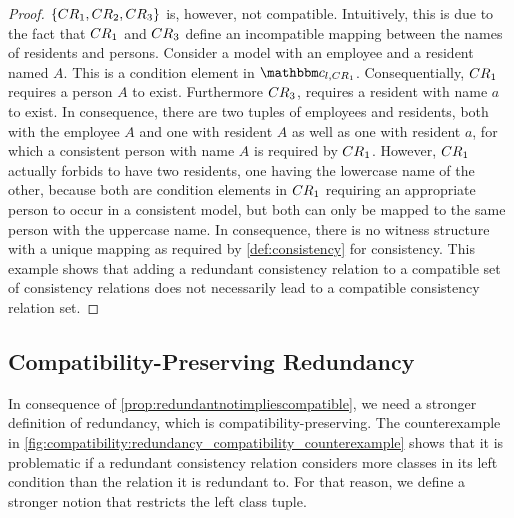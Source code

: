 \begin{proof}
$\setted{\consistencyrelation{CR}{1}, \consistencyrelation{CR}{2}, \consistencyrelation{CR}{3}}$ is, however, not compatible.
Intuitively, this is due to the fact that $\consistencyrelation{CR}{1}$ and $\consistencyrelation{CR}{3}$ define an incompatible mapping between the names of residents and persons.
Consider a model with an employee and a resident named $A$. This is a condition element in $\condition{c}{l,\consistencyrelation{CR}{1}}$. 
Consequentially, $\consistencyrelation{CR}{1}$ requires a person $A$ to exist. Furthermore $\consistencyrelation{CR}{3}$, requires a resident with name $a$ to exist.
In consequence, there are two tuples of employees and residents, both with the employee $A$ and one with resident $A$ as well as one with resident $a$, for which a consistent person with name $A$ is required by $\consistencyrelation{CR}{1}$.
However, $\consistencyrelation{CR}{1}$ actually forbids to have two residents, one having the lowercase name of the other, because both are condition elements in $\consistencyrelation{CR}{1}$ requiring an appropriate person to occur in a consistent model, but both can only be mapped to the same person with the uppercase name.
In consequence, there is no witness structure with a unique mapping as required by \autoref{def:consistency} for consistency.
This example shows that adding a redundant consistency relation to a compatible set of consistency relations does not necessarily lead to a compatible consistency relation set.
\end{proof}



\subsection{Compatibility-Preserving Redundancy}

In consequence of \autoref{prop:redundantnotimpliescompatible}, we need a stronger definition of redundancy, which is compatibility-preserving. 
The counterexample in \autoref{fig:compatibility:redundancy_compatibility_counterexample} shows that it is problematic if a redundant consistency relation considers more classes in its left condition than the relation it is redundant to.
For that reason, we define a stronger notion that restricts the left class tuple.

